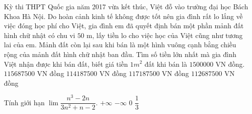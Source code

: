 \begin{ex}%
	Kỳ thi THPT Quốc gia năm 2017 vừa kết thúc, Việt đỗ vào trường  đại học Bách Khoa Hà Nội. Do hoàn cảnh kinh tế không được tốt nên gia đình rất lo lắng về việc đóng học phí cho Việt, gia đình em đã quyết định bán một phần mảnh đất hình chữ nhật có chu vi $50$ m, lấy tiền lo cho việc học của Việt cũng như tương lai của em. Mảnh đất còn lại sau khi bán là một hình vuông cạnh bằng chiều rộng của mảnh đất hình chữ nhật ban đầu. Tìm số tiền lớn nhất mà gia đình Việt nhận được khi bán đất, biết giá tiền $1 m^2$ đất khi bán là $1500000$ VN đồng.
	\choice
	{ $115687500$ VN  đồng}
	{ $114187500$ VN  đồng}
	{\True $117187500$ VN  đồng}
	{ $112687500$ VN  đồng}
	
\end{ex}
\begin{ex}%
	Tính giới hạn $\lim \dfrac{n^3-2n}{3n^2+n-2}$.
	\choice
	{\True $+\infty $}
	{$-\infty $}
	{$0$}
	{$\dfrac{1}{3}$}
\end{ex}
